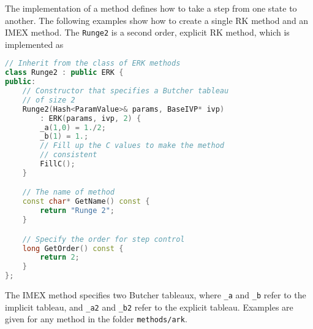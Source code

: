 \documentclass[11pt]{article}
\begin{document}
The implementation of a method defines how to take a step from one state to another. The following examples show how to create a single RK method and an IMEX method. The \verb=Runge2= is a second order, explicit RK method, which is implemented as
\begin{lstlisting}[tabsize=4,language=c++]
// Inherit from the class of ERK methods
class Runge2 : public ERK {
public:
	// Constructor that specifies a Butcher tableau
	// of size 2
	Runge2(Hash<ParamValue>& params, BaseIVP* ivp)
		: ERK(params, ivp, 2) {
		_a(1,0) = 1./2;
		_b(1) = 1.;
		// Fill up the C values to make the method
		// consistent
		FillC();
	}

	// The name of method
	const char* GetName() const {
		return "Runge 2";
	}

	// Specify the order for step control	
	long GetOrder() const {
		return 2;
	}
};
\end{lstlisting}

The IMEX method specifies two Butcher tableaux, where \verb=_a= and \verb=_b= refer to the implicit tableau, and \verb=_a2= and \verb=_b2= refer to the explicit tableau. Examples are given for any method in the folder \verb=methods/ark=.



\end{document}
